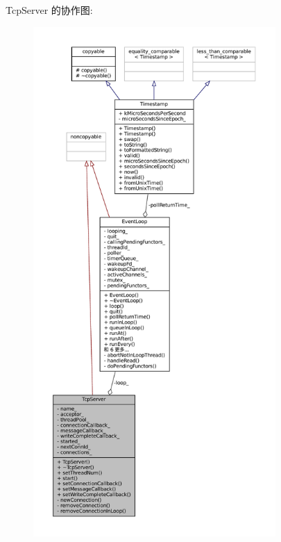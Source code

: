 Tcp\+Server 的协作图\+:
\nopagebreak
\begin{figure}[H]
\begin{center}
\leavevmode
\includegraphics[height=550pt]{classmuduo_1_1TcpServer__coll__graph}
\end{center}
\end{figure}
